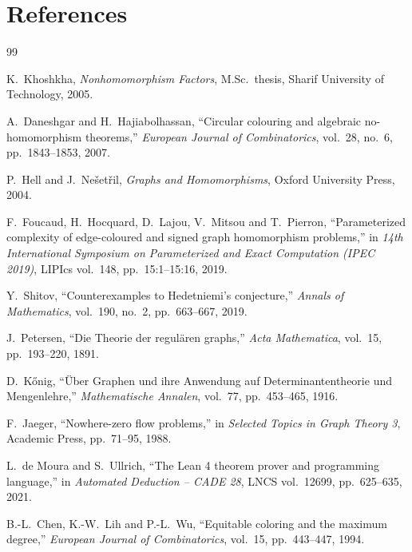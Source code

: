 \documentclass{article}
\theoremstyle{definition}
\begin{document}
\section*{References}

\begin{thebibliography}{99}

K.~Khoshkha,
\textit{Nonhomomorphism Factors},
M.Sc.\ thesis, Sharif University of Technology, 2005.

A.~Daneshgar and H.~Hajiabolhassan,
``Circular colouring and algebraic no-homomorphism theorems,''
\textit{European Journal of Combinatorics},
vol.~28, no.~6, pp.~1843--1853, 2007.

P.~Hell and J.~Ne\v{s}et\v{r}il,
\textit{Graphs and Homomorphisms},
Oxford University Press, 2004.

F.~Foucaud, H.~Hocquard, D.~Lajou, V.~Mitsou and T.~Pierron,
``Parameterized complexity of edge-coloured and signed graph homomorphism
problems,''
in \textit{14th International Symposium on Parameterized and Exact
Computation (IPEC 2019)}, LIPIcs vol.~148, pp.~15:1--15:16, 2019.

Y.~Shitov,
``Counterexamples to Hedetniemi's conjecture,''
\textit{Annals of Mathematics},
vol.~190, no.~2, pp.~663--667, 2019.

J.~Petersen,
``Die Theorie der regul\"aren graphs,''
\textit{Acta Mathematica}, vol.~15, pp.~193--220, 1891.

D.~K\H{o}nig,
``\"Uber Graphen und ihre Anwendung auf Determinantentheorie und
Mengenlehre,''
\textit{Mathematische Annalen}, vol.~77, pp.~453--465, 1916.

F.~Jaeger,
``Nowhere-zero flow problems,''
in \textit{Selected Topics in Graph Theory 3}, Academic Press,
pp.~71--95, 1988.

L.~de Moura and S.~Ullrich,
``The Lean 4 theorem prover and programming language,''
in \textit{Automated Deduction -- CADE 28}, LNCS vol.~12699, pp.~625--635, 2021.

B.-L.~Chen, K.-W.~Lih and P.-L.~Wu,
``Equitable coloring and the maximum degree,''
\textit{European Journal of Combinatorics}, vol.~15, pp.~443--447, 1994.


\end{thebibliography}
\end{document}
